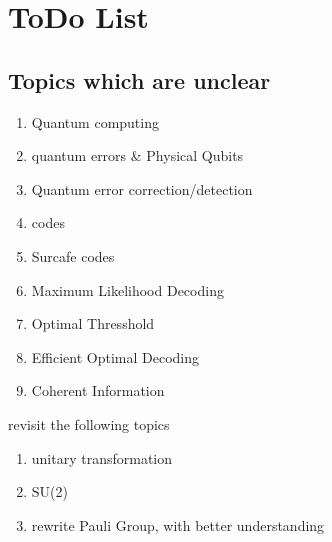\section{ToDo List}

\subsection{Topics which are unclear}

\begin{enumerate}
    \item Quantum computing 
    \item quantum errors \& Physical Qubits
    \item Quantum error correction/detection
    \item codes 
    \item Surcafe codes
    \item Maximum Likelihood Decoding 
    \item Optimal Thresshold
    \item Efficient Optimal Decoding
    \item Coherent Information
\end{enumerate}

revisit the following topics

\begin{enumerate}
    \item unitary transformation
    \item SU(2)
    \item rewrite Pauli Group, with better understanding
\end{enumerate}
